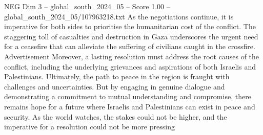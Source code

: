 \begin{textsample}{NEG Dim 3 – global\_south\_2024\_05 – Score 1.00 – global\_south\_2024\_05/107963218.txt}
As the negotiations continue, it is imperative for both sides to prioritise the humanitarian cost of the conflict.
The staggering toll of casualties and destruction in Gaza underscores the urgent need for a ceasefire that can alleviate the suffering of civilians caught in the crossfire.
Advertisement Moreover, a lasting resolution must address the root causes of the conflict, including the underlying grievances and aspirations of both Israelis and Palestinians.
Ultimately, the path to peace in the region is fraught with challenges and uncertainties.
But by engaging in genuine dialogue and demonstrating a commitment to mutual understanding and compromise, there remains hope for a future where Israelis and Palestinians can exist in peace and security.
As the world watches, the stakes could not be higher, and the imperative for a resolution could not be more pressing

\end{textsample}
